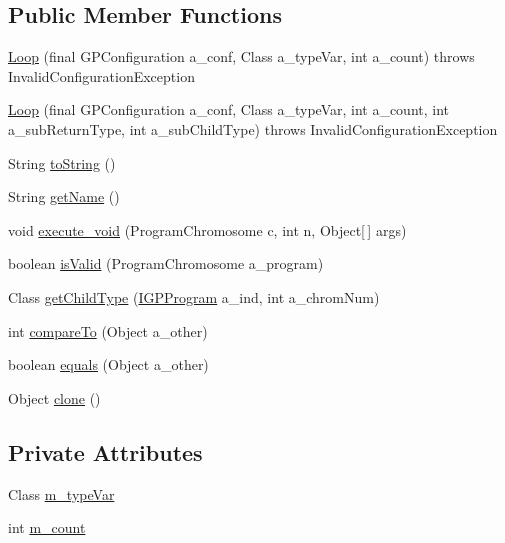 \subsection*{Public Member Functions}
\begin{DoxyCompactItemize}
\item 
\hyperlink{classorg_1_1jgap_1_1gp_1_1function_1_1_loop_a2ea302524553b6bd4c54d802cf0c75bf}{Loop} (final G\-P\-Configuration a\-\_\-conf, Class a\-\_\-type\-Var, int a\-\_\-count)  throws Invalid\-Configuration\-Exception 
\item 
\hyperlink{classorg_1_1jgap_1_1gp_1_1function_1_1_loop_ab5014c2d317e00b0100dab236d4bc70b}{Loop} (final G\-P\-Configuration a\-\_\-conf, Class a\-\_\-type\-Var, int a\-\_\-count, int a\-\_\-sub\-Return\-Type, int a\-\_\-sub\-Child\-Type)  throws Invalid\-Configuration\-Exception 
\item 
String \hyperlink{classorg_1_1jgap_1_1gp_1_1function_1_1_loop_a594cbdc0e3cb7fc771ba0b0909b67354}{to\-String} ()
\item 
String \hyperlink{classorg_1_1jgap_1_1gp_1_1function_1_1_loop_a6c0e4a5a10458f42521b4febab4deb69}{get\-Name} ()
\item 
void \hyperlink{classorg_1_1jgap_1_1gp_1_1function_1_1_loop_a8fe0bbf56b4f02deff50f734d5cece30}{execute\-\_\-void} (Program\-Chromosome c, int n, Object\mbox{[}$\,$\mbox{]} args)
\item 
boolean \hyperlink{classorg_1_1jgap_1_1gp_1_1function_1_1_loop_a0823a5ee40f5529344ef5809df621f30}{is\-Valid} (Program\-Chromosome a\-\_\-program)
\item 
Class \hyperlink{classorg_1_1jgap_1_1gp_1_1function_1_1_loop_adcb1d4b96588eb05dc810cfa37453d17}{get\-Child\-Type} (\hyperlink{interfaceorg_1_1jgap_1_1gp_1_1_i_g_p_program}{I\-G\-P\-Program} a\-\_\-ind, int a\-\_\-chrom\-Num)
\item 
int \hyperlink{classorg_1_1jgap_1_1gp_1_1function_1_1_loop_a845e8350839c0ca5029ac7bcdc7f3d0f}{compare\-To} (Object a\-\_\-other)
\item 
boolean \hyperlink{classorg_1_1jgap_1_1gp_1_1function_1_1_loop_acf7be2c2089bf9f9ae1ee293969b32c8}{equals} (Object a\-\_\-other)
\item 
Object \hyperlink{classorg_1_1jgap_1_1gp_1_1function_1_1_loop_ac63b1505eaf445ed70ed93b7a357719e}{clone} ()
\end{DoxyCompactItemize}
\subsection*{Private Attributes}
\begin{DoxyCompactItemize}
\item 
Class \hyperlink{classorg_1_1jgap_1_1gp_1_1function_1_1_loop_a70ca2857d065b0e60e3bc89a4c82b13f}{m\-\_\-type\-Var}
\item 
int \hyperlink{classorg_1_1jgap_1_1gp_1_1function_1_1_loop_a61389100a9c8382941df52ef7a84de05}{m\-\_\-count}
\end{DoxyCompactItemize}
